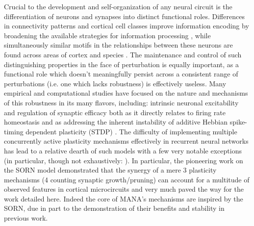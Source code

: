 \documentclass[10pt,letterpaper]{article}
\begin{document}
Crucial to the development and self-organization of any neural circuit is the differentiation of neurons and synapses into distinct functional roles. Differences in connectivity patterns and cortical cell classes improve information encoding by broadening the available strategies for information processing \cite{harris2013cortical}, while simultaneously similar motifs in the relationships between these neurons are found across areas of cortex and species \cite{harris2015neocortical}.  The maintenance and control of such distinguishing properties in the face of perturbation is equally important, as a functional role which doesn't meaningfully persist across a consistent range of perturbations (i.e. one which lacks robustness) is effectively useless. Many empirical and computational studies have focused on the nature and mechanisms of this robustness in its many flavors, including: intrinsic neuronal excitability \cite{desai1999plasticity, barth2004alteration, hong1995activity, o2014cell, marder2014neuromodulation, remme2012homeostatic} and regulation of synaptic efficacy both as it directly relates to firing rate homeostasis \cite{turrigiano2004homeostatic, turrigiano2012homeostatic, marder2014neuromodulation, ibata2008rapid} and as addressing the inherent instability of additive Hebbian spike-timing dependent plasticity (STDP) \cite{gilson2011stability, van2000stable, kempter2001intrinsic}. The difficulty of implementing multiple concurrently active plasticity mechanisms effectively in recurrent neural networks \cite{markram1997regulation, bi1998synaptic} has lead to a relative dearth of such models with a few very notable exceptions (in particular, though not exhaustively: \cite{lazar2009sorn, zheng2013network, miner2016plasticity, litwin2014formation, vogels2011inhibitory, effenberger2015self}). In particular, the pioneering work on the SORN model demonstrated that the synergy of a mere 3 plasticity mechanisms (4 counting synaptic growth/pruning) can account for a multitude of observed features in cortical microcircuits \cite{lazar2009sorn, zheng2013network, miner2016plasticity} and very much paved the way for the work detailed here.  Indeed the core of MANA's mechanisms are inspired by the SORN, due in part to the demonstration of their benefits and stability in previous work\cite{lazar2009sorn}. 
\end{document}
